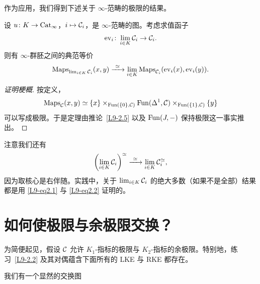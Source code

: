 \nitem\label{L9-2.6} 作为应用，我们得到下述关于 $\infty$-范畴的极限的结果。

\begin{theorem}\label{L9-2.7}
设 $u\colon K\to\operatorname{Cat}_\infty$，$i\mapsto\mathcal{C}_i$，是 $\infty$-范畴的图。考虑求值函子
\[
\mathrm{ev}_i\colon\lim_{i\in K}\mathcal{C}_i\to\mathcal{C}_i.
\]
则有 $\infty$-群胚之间的典范等价
\begin{equation}\label{L9-eq2.1}
\operatorname{Maps}_{\lim_{i\in K}\cC_i}(x,y)\xrightarrow{\ \simeq\ }\lim_{i\in K}\operatorname{Maps}_{\cC_i}(\mathrm{ev}_i(x),\mathrm{ev}_i(y)).
\end{equation}
\end{theorem}

\begin{proof}[证明梗概]
按定义，
\[
\operatorname{Maps}_{\mathcal{C}}(x,y)\simeq\{x\}\times_{\operatorname{Fun}(\{0\},\mathcal{C})}\operatorname{Fun}(\Delta^1,\mathcal{C})\times_{\operatorname{Fun}(\{1\},\mathcal{C})}\{y\}
\]
可以写成极限。于是定理由推论~\ref{L9-2.5} 以及 $\operatorname{Fun}(J,-)$ 保持极限这一事实推出。
\end{proof}

\begin{remark}\label{L9-2.8}
注意我们还有
\begin{equation}\label{L9-eq2.2}
\left(\lim_{i\in K}\cC_i\right)^{\simeq}\xrightarrow{\ \simeq\ }\lim_{i\in K}\cC_i^{\simeq},
\end{equation}
因为取核心是右伴随。实践中，关于 $\lim_{i\in K}\mathcal{C}_i$ 的绝大多数（如果不是全部）结果都是用 \eqref{L9-eq2.1} 与 \eqref{L9-eq2.2} 证明的。
\end{remark}


\section{如何使极限与余极限交换？}

\nitem\label{L9-3.1} 为简便起见，假设 $\mathcal{C}$ 允许 $K_1$-指标的极限与 $K_2$-指标的余极限。特别地，练习~\ref{L9-2.2} 及其对偶蕴含下面所有的 LKE 与 RKE 都存在。

\begin{construction}\label{L9-3.2}
我们有一个显然的交换图
\begin{center}
\end{center}
\end{construction}

